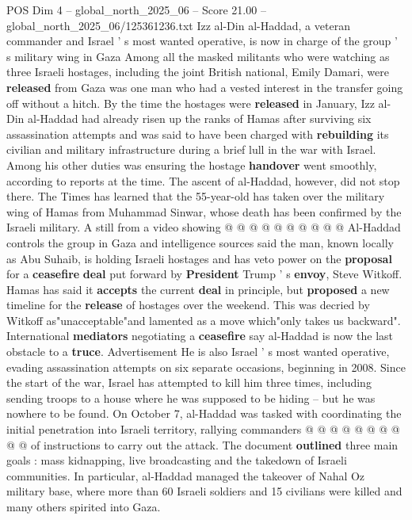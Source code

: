 \begin{textsample}{POS Dim 4 – global\_north\_2025\_06 – Score 21.00 – global\_north\_2025\_06/125361236.txt}  \label{ex:f4_pos_395}
Izz al-Din al-Haddad, a veteran commander and Israel ' s most wanted operative, is now in charge of the group ' s military wing in Gaza Among all the masked militants who were watching as three Israeli hostages, including the joint British national, Emily Damari, were \textbf{released} from Gaza was one man who had a vested interest in the transfer going off without a hitch.
By the time the hostages were \textbf{released} in January, Izz al-Din al-Haddad had already risen up the ranks of Hamas after surviving six assassination attempts and was said to have been charged with \textbf{rebuilding} its civilian and military infrastructure during a brief lull in the war with Israel.
Among his other duties was ensuring the hostage \textbf{handover} went smoothly, according to reports at the time.
The ascent of al-Haddad, however, did not stop there.
The Times has learned that the 55-year-old has taken over the military wing of Hamas from Muhammad Sinwar, whose death has been confirmed by the Israeli military.
A still from a video showing @ @ @ @ @ @ @ @ @ @ Al-Haddad controls the group in Gaza and intelligence sources said the man, known locally as Abu Suhaib, is holding Israeli hostages and has veto power on the \textbf{proposal} for a \textbf{ceasefire} \textbf{deal} put forward by \textbf{President} Trump ' s \textbf{envoy}, Steve Witkoff.
Hamas has said it \textbf{accepts} the current \textbf{deal} in principle, but \textbf{proposed} a new timeline for the \textbf{release} of hostages over the weekend.
This was decried by Witkoff as"unacceptable"and lamented as a move which"only takes us backward".
International \textbf{mediators} negotiating a \textbf{ceasefire} say al-Haddad is now the last obstacle to a \textbf{truce}.
Advertisement He is also Israel ' s most wanted operative, evading assassination attempts on six separate occasions, beginning in 2008.
Since the start of the war, Israel has attempted to kill him three times, including sending troops to a house where he was supposed to be hiding -- but he was nowhere to be found.
On October 7, al-Haddad was tasked with coordinating the initial penetration into Israeli territory, rallying commanders @ @ @ @ @ @ @ @ @ @ of instructions to carry out the attack.
The document \textbf{outlined} three main goals : mass kidnapping, live broadcasting and the takedown of Israeli communities.
In particular, al-Haddad managed the takeover of Nahal Oz military base, where more than 60 Israeli soldiers and 15 civilians were killed and many others spirited into Gaza.

\end{textsample}

